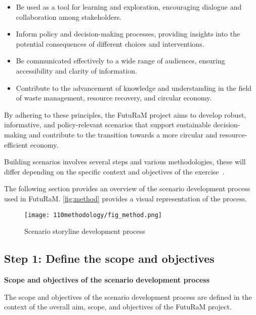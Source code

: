 \begin{itemize}
  \item Be used as a tool for learning and exploration, encouraging dialogue and collaboration among stakeholders.
  \item Inform policy and decision-making processes, providing insights into the potential consequences of different choices and interventions.
  \item Be communicated effectively to a wide range of audiences, ensuring accessibility and clarity of information.
  \item Contribute to the advancement of knowledge and understanding in the field of waste management, resource recovery, and circular economy.
\end{itemize}

By adhering to these principles, the FutuRaM project aims to develop robust, informative, and policy-relevant scenarios that support sustainable decision-making and contribute to the transition towards a more circular and resource-efficient economy.


Building scenarios involves several steps and various methodologies, these will differ depending on the specific context and objectives of the exercise~\cite{bishop2007scenarios,dreborg1996essence,cordovapozo2023scenarios,sardesai2021,amer2013,boerjeson2005scenariosreport, boerjeson2005scenariosarticle,skea2021outlooks,vannotten2003scenario}.

The following section provides an overview of the scenario development process used in FutuRaM. \autoref{fig:method} provides a visual representation of the process.



\begin{figure}[h!]
  \centering
  \texttt{[image: 110methodology/fig\_method.png]}
  \caption{Scenario storyline development process}\label{fig:method}
\end{figure}



\subsection{Step 1: Define the scope and objectives}
\textbf{Scope and objectives of the scenario development process}

The scope and objectives of the scenario development process are defined in the context of the overall aim, scope, and objectives of the FutuRaM project.

